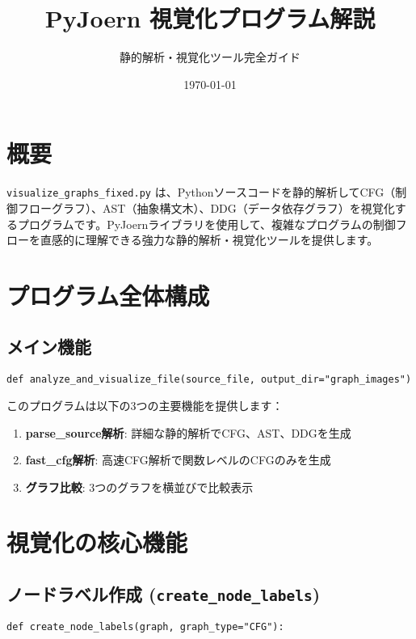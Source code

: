 \documentclass[a4paper,12pt]{article}
\title{\Huge\bfseries PyJoern 視覚化プログラム解説}
\author{静的解析・視覚化ツール完全ガイド}
\date{\today}
\begin{document}
\maketitle
\tableofcontents
\newpage

\section{概要}

\texttt{visualize\_graphs\_fixed.py} は、Pythonソースコードを静的解析してCFG（制御フローグラフ）、AST（抽象構文木）、DDG（データ依存グラフ）を視覚化するプログラムです。PyJoernライブラリを使用して、複雑なプログラムの制御フローを直感的に理解できる強力な静的解析・視覚化ツールを提供します。

\section{プログラム全体構成}

\subsection{メイン機能}

\begin{lstlisting}[caption=メイン関数]
def analyze_and_visualize_file(source_file, output_dir="graph_images")
\end{lstlisting}

このプログラムは以下の3つの主要機能を提供します：

\begin{enumerate}
    \item \textbf{parse\_source解析}: 詳細な静的解析でCFG、AST、DDGを生成
    \item \textbf{fast\_cfg解析}: 高速CFG解析で関数レベルのCFGのみを生成
    \item \textbf{グラフ比較}: 3つのグラフを横並びで比較表示
\end{enumerate}

\section{視覚化の核心機能}

\subsection{ノードラベル作成 (\texttt{create\_node\_labels})}

\begin{lstlisting}[caption=ノードラベル作成関数]
def create_node_labels(graph, graph_type="CFG"):
\end{lstlisting}
\end{document}
